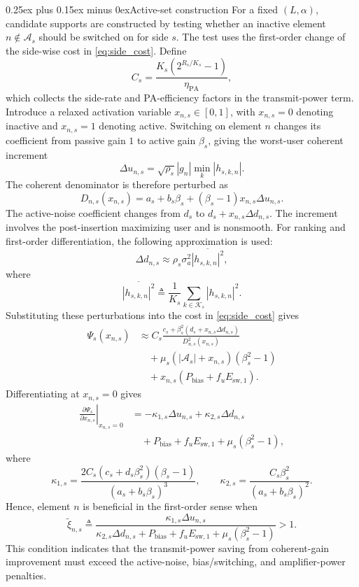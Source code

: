 \documentclass[journal]{IEEEtran}
\makeatletter
\def\subsection{\@startsection{subsection}{2}{\z@}{1.05ex plus 0.35ex minus 0.2ex}%
{0.25ex plus 0.15ex minus 0ex}{\normalfont\normalsize\itshape}}%
\makeatother
\begin{document}
\subsection{Active-set construction}
For a fixed $(L,\alpha)$, candidate supports are constructed by testing whether an inactive element $n\notin\mathcal{A}_s$ should be switched on for side $s$. The test uses the first-order change of the side-wise cost in \eqref{eq:side_cost}. Define
\[
C_s=\frac{K_s(2^{R_s/K_s}-1)}{\eta_{\mathrm{PA}}},
\]
which collects the side-rate and PA-efficiency factors in the transmit-power term. Introduce a relaxed activation variable $x_{n,s}\in[0,1]$, with $x_{n,s}=0$ denoting inactive and $x_{n,s}=1$ denoting active. Switching on element $n$ changes its coefficient from passive gain $1$ to active gain $\beta_s$, giving the worst-user coherent increment
\[
\Delta u_{n,s}=\sqrt{\rho_s}|g_n|\min_k|h_{s,k,n}|.
\]
The coherent denominator is therefore perturbed as
\[
D_{n,s}(x_{n,s})=a_s+b_s\beta_s+(\beta_s-1)x_{n,s}\Delta u_{n,s}.
\]
The active-noise coefficient changes from $d_s$ to $d_s+x_{n,s}\Delta d_{n,s}$. The increment involves the post-insertion maximizing user and is nonsmooth. For ranking and first-order differentiation, the following approximation is used:
\[
\Delta d_{n,s}\approx \rho_s\sigma_a^2\overline{|h_{s,k,n}|^2},
\]
where
\[
\overline{|h_{s,k,n}|^2}\triangleq \frac{1}{K_s}\sum_{k\in\mathcal{K}_s}|h_{s,k,n}|^2.
\]
Substituting these perturbations into the cost in \eqref{eq:side_cost} gives
\[
\begin{aligned}
\Psi_s(x_{n,s})
&\approx
C_s\frac{c_s+\beta_s^2(d_s+x_{n,s}\Delta d_{n,s})}{D_{n,s}^2(x_{n,s})} \\
&\quad +\mu_s(|\mathcal{A}_s|+x_{n,s})(\beta_s^2-1)\\
&\quad +x_{n,s}(P_{\mathrm{bias}}+f_uE_{\mathrm{sw},1}).
\end{aligned}
\]
Differentiating at $x_{n,s}=0$ gives
\[
\begin{aligned}
\left.\frac{\partial \Psi_s}{\partial x_{n,s}}\right|_{x_{n,s}=0}
&= -\kappa_{1,s}\Delta u_{n,s}+\kappa_{2,s}\Delta d_{n,s} \\
&\quad +P_{\mathrm{bias}}+f_uE_{\mathrm{sw},1}
+\mu_s(\beta_s^2-1),
\end{aligned}
\]
where
\[
\kappa_{1,s}=\frac{2C_s(c_s+d_s\beta_s^2)(\beta_s-1)}{(a_s+b_s\beta_s)^3},
\qquad
\kappa_{2,s}=\frac{C_s\beta_s^2}{(a_s+b_s\beta_s)^2}.
\]
Hence, element $n$ is beneficial in the first-order sense when
\[
\tilde{\xi}_{n,s}\triangleq
\frac{\kappa_{1,s}\Delta u_{n,s}}
{\kappa_{2,s}\Delta d_{n,s}+P_{\mathrm{bias}}+f_uE_{\mathrm{sw},1}+\mu_s(\beta_s^2-1)} > 1.
\]
This condition indicates that the transmit-power saving from coherent-gain improvement must exceed the active-noise, bias/switching, and amplifier-power penalties.
\end{document}
